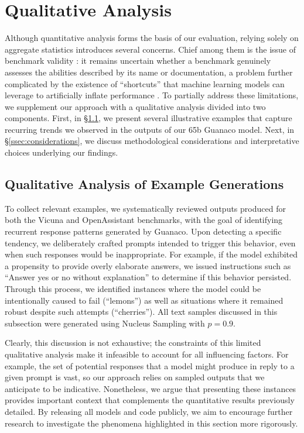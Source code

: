 \section{Qualitative Analysis}

Although quantitative analysis forms the basis of our evaluation, relying solely on aggregate statistics introduces several concerns. Chief among them is the issue of benchmark validity \citep{liao2021we}: it remains uncertain whether a benchmark genuinely assesses the abilities described by its name or documentation, a problem further complicated by the existence of “shortcuts” that machine learning models can leverage to artificially inflate performance \citep{gururangan2018annotation, poliak2018hypothesis}. To partially address these limitations, we supplement our approach with a qualitative analysis divided into two components. First, in \S\ref{ssec:examples}, we present several illustrative examples that capture recurring trends we observed in the outputs of our 65b {Guanaco} model. Next, in \S\ref{ssec:considerations}, we discuss methodological considerations and interpretative choices underlying our findings.

\subsection{Qualitative Analysis of Example Generations}
\label{ssec:examples}

To collect relevant examples, we systematically reviewed outputs produced for both the Vicuna and OpenAssistant benchmarks, with the goal of identifying recurrent response patterns generated by {Guanaco}. Upon detecting a specific tendency, we deliberately crafted prompts intended to trigger this behavior, even when such responses would be inappropriate. For example, if the model exhibited a propensity to provide overly elaborate answers, we issued instructions such as ``Answer yes or no without explanation'' to determine if this behavior persisted. Through this process, we identified instances where the model could be intentionally caused to fail (“lemons”) as well as situations where it remained robust despite such attempts (“cherries”). All text samples discussed in this subsection were generated using Nucleus Sampling \cite{holtzmancurious} with $p=0.9$.

Clearly, this discussion is not exhaustive; the constraints of this limited qualitative analysis make it infeasible to account for all influencing factors. For example, the set of potential responses that a model might produce in reply to a given prompt is vast, so our approach relies on sampled outputs that we anticipate to be indicative. Nonetheless, we argue that presenting these instances provides important context that complements the quantitative results previously detailed. By releasing all models and code publicly, we aim to encourage further research to investigate the phenomena highlighted in this section more rigorously.

